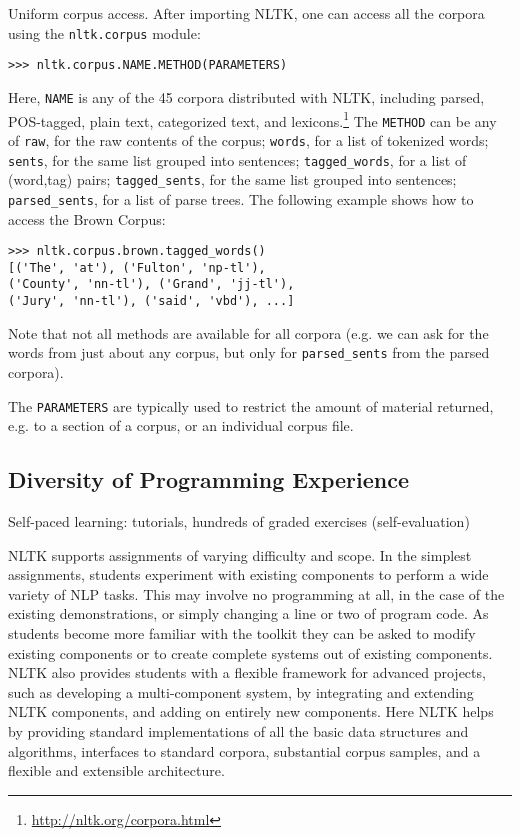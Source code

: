 \documentclass[11pt]{article}
\begin{document}
Uniform corpus access.  After importing NLTK, one can access all the corpora
using the \texttt{nltk.corpus} module:

{\small\begin{verbatim}
>>> nltk.corpus.NAME.METHOD(PARAMETERS)
\end{verbatim}}

Here, \texttt{NAME} is any of the 45 corpora distributed with NLTK, including
parsed, POS-tagged, plain text, categorized text, and lexicons.\footnote{\url{http://nltk.org/corpora.html}}
The \texttt{METHOD} can be any of
\texttt{raw}, for the raw contents of the corpus;
\texttt{words}, for a list of tokenized words;
\texttt{sents}, for the same list grouped into sentences;
\texttt{tagged\_words}, for a list of (word,tag) pairs;
\texttt{tagged\_sents}, for the same list grouped into sentences;
\texttt{parsed\_sents}, for a list of parse trees.
The following example shows how to access the Brown Corpus:

{\small\begin{verbatim}
>>> nltk.corpus.brown.tagged_words()
[('The', 'at'), ('Fulton', 'np-tl'),
('County', 'nn-tl'), ('Grand', 'jj-tl'),
('Jury', 'nn-tl'), ('said', 'vbd'), ...]
\end{verbatim}}

Note that not all methods are available for all corpora (e.g. we can
ask for the words from just about any corpus, but only for
\texttt{parsed\_sents} from the parsed corpora).

The \texttt{PARAMETERS} are typically used to restrict the amount of material returned,
e.g. to a section of a corpus, or an individual corpus file.

\subsection{Diversity of Programming Experience}

Self-paced learning: tutorials, hundreds of graded exercises (self-evaluation)

NLTK supports assignments of varying difficulty and scope. In the
simplest assignments, students experiment with existing components to
perform a wide variety of NLP tasks. This may involve no programming
at all, in the case of the existing demonstrations, or simply changing
a line or two of program code. As students become more familiar with
the toolkit they can be asked to modify existing components or to
create complete systems out of existing components. NLTK also provides
students with a flexible framework for advanced projects, such as
developing a multi-component system, by integrating and extending NLTK
components, and adding on entirely new components. Here NLTK helps by
providing standard implementations of all the basic data structures
and algorithms, interfaces to standard corpora, substantial corpus
samples, and a flexible and extensible architecture.
\end{document}
